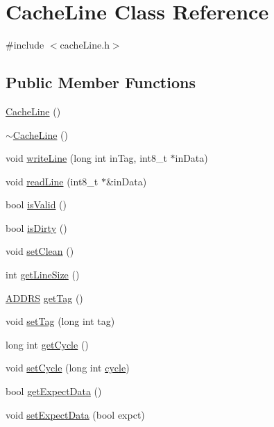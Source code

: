 \hypertarget{classCacheLine}{
\section{CacheLine Class Reference}
\label{classCacheLine}
}


{\ttfamily \#include $<$cacheLine.h$>$}

\subsection*{Public Member Functions}
\begin{DoxyCompactItemize}
\item 
\hyperlink{classCacheLine_a7fcd0784f096f49c5f0305c00e2469fa}{CacheLine} ()
\item 
\hyperlink{classCacheLine_ac0800bc7e0bae2ef5625630c10a4a394}{$\sim$CacheLine} ()
\item 
void \hyperlink{classCacheLine_ad59b5f7ffc859f0030f89e3bb5780b63}{writeLine} (long int inTag, int8\_\-t $\ast$inData)
\item 
void \hyperlink{classCacheLine_a3e210e3e77ff0f32f2abbdaa89d5fb34}{readLine} (int8\_\-t $\ast$\&inData)
\item 
bool \hyperlink{classCacheLine_a1a40d37c4061fb781a4d10961bed69f1}{isValid} ()
\item 
bool \hyperlink{classCacheLine_afed987cce2570b44fd809fde13730cd8}{isDirty} ()
\item 
void \hyperlink{classCacheLine_a13c9c3c7fd7fe534ef02b57cbc33011b}{setClean} ()
\item 
int \hyperlink{classCacheLine_af26e8419cd2046f87cd41bc6e3db5599}{getLineSize} ()
\item 
\hyperlink{global_2global_8h_a7ea74bb9ffd2e4d41550ae2383dd25bc}{ADDRS} \hyperlink{classCacheLine_a5411336f888d3095ba6d54cf2359baec}{getTag} ()
\item 
void \hyperlink{classCacheLine_a3a34685f69adcc6de9fcb01d36b9ef7e}{setTag} (long int tag)
\item 
long int \hyperlink{classCacheLine_a05fbf7e132ca588cf98228a2e0daf915}{getCycle} ()
\item 
void \hyperlink{classCacheLine_a0aee67a4391b8531292f629f0b47ff5c}{setCycle} (long int \hyperlink{vliwScheduler_8cpp_a1f4871d45089b039d95d3832dd123827}{cycle})
\item 
bool \hyperlink{classCacheLine_a3fe73f9f8e02abf4acc935a3d7849efa}{getExpectData} ()
\item 
void \hyperlink{classCacheLine_a7ad6add47edafaaf8f8b12a7f54e0b6d}{setExpectData} (bool expct)
\end{DoxyCompactItemize}


